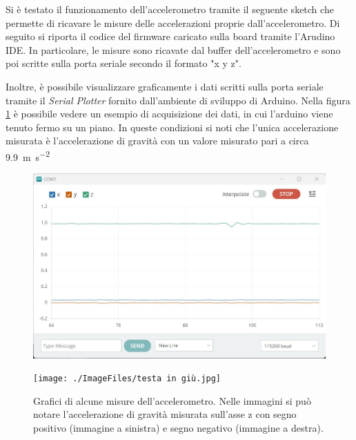 Si è testato il funzionamento dell'accelerometro tramite il seguente sketch che permette di ricavare le misure delle accelerazioni proprie dall'accelerometro. Di seguito si riporta il codice del firmware caricato sulla board tramite l'Arudino IDE. In particolare, le misure sono ricavate dal buffer dell'accelerometro e sono poi scritte sulla porta seriale secondo il formato "{x} {y} {z}".


Inoltre, è possibile visualizzare graficamente i dati scritti sulla porta seriale tramite il \textit{Serial Plotter} fornito dall'ambiente di sviluppo di Arduino. Nella figura \ref{fig:serial_plotter} è possibile vedere un esempio di acquisizione dei dati, in cui l'arduino viene tenuto fermo su un piano. In queste condizioni si noti che l'unica accelerazione misurata è l'accelerazione di gravità con un valore misurato pari a circa \SI{9.9}{\meter \per \second^2}
\begin{figure}[tbh]
	\centering
	\begin{minipage}{.45\textwidth}
		\includegraphics[width=\linewidth]{./ImageFiles/fermo.jpg}
	\end{minipage}
	\begin{minipage}{.45\textwidth}
		\texttt{[image: ./ImageFiles/testa in giù.jpg]}
	\end{minipage}
	\caption{Grafici di alcune misure dell'accelerometro. Nelle immagini si può notare l'accelerazione di gravità misurata sull'asse z con segno positivo (immagine a sinistra) e segno negativo (immagine a destra).}
	\label{fig:serial_plotter}
\end{figure}